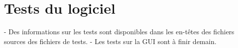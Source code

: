 \section{Tests du logiciel}

  - Des informations sur les tests sont disponibles dans les en-têtes des
  fichiers sources des fichiers de tests.
  - Les tests sur la GUI sont à finir demain.
